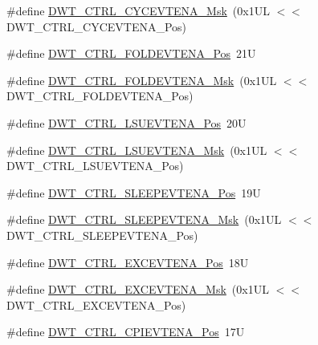 \begin{DoxyCompactItemize}
\item 
\#define \mbox{\hyperlink{group___c_m_s_i_s___d_w_t_ga40554bd81460e39abf08810f45fac1a2}{D\+W\+T\+\_\+\+C\+T\+R\+L\+\_\+\+C\+Y\+C\+E\+V\+T\+E\+N\+A\+\_\+\+Msk}}~(0x1\+U\+L $<$$<$ D\+W\+T\+\_\+\+C\+T\+R\+L\+\_\+\+C\+Y\+C\+E\+V\+T\+E\+N\+A\+\_\+\+Pos)
\item 
\#define \mbox{\hyperlink{group___c_m_s_i_s___d_w_t_ga5602b0707f446ce78d88ff2a3a82bfff}{D\+W\+T\+\_\+\+C\+T\+R\+L\+\_\+\+F\+O\+L\+D\+E\+V\+T\+E\+N\+A\+\_\+\+Pos}}~21U
\item 
\#define \mbox{\hyperlink{group___c_m_s_i_s___d_w_t_ga717e679d775562ae09185a3776b1582f}{D\+W\+T\+\_\+\+C\+T\+R\+L\+\_\+\+F\+O\+L\+D\+E\+V\+T\+E\+N\+A\+\_\+\+Msk}}~(0x1\+U\+L $<$$<$ D\+W\+T\+\_\+\+C\+T\+R\+L\+\_\+\+F\+O\+L\+D\+E\+V\+T\+E\+N\+A\+\_\+\+Pos)
\item 
\#define \mbox{\hyperlink{group___c_m_s_i_s___d_w_t_gaea5d1ee72188dc1d57b54c60a9f5233e}{D\+W\+T\+\_\+\+C\+T\+R\+L\+\_\+\+L\+S\+U\+E\+V\+T\+E\+N\+A\+\_\+\+Pos}}~20U
\item 
\#define \mbox{\hyperlink{group___c_m_s_i_s___d_w_t_gac47427f455fbc29d4b6f8a479169f2b2}{D\+W\+T\+\_\+\+C\+T\+R\+L\+\_\+\+L\+S\+U\+E\+V\+T\+E\+N\+A\+\_\+\+Msk}}~(0x1\+U\+L $<$$<$ D\+W\+T\+\_\+\+C\+T\+R\+L\+\_\+\+L\+S\+U\+E\+V\+T\+E\+N\+A\+\_\+\+Pos)
\item 
\#define \mbox{\hyperlink{group___c_m_s_i_s___d_w_t_ga9c6d62d121164013a8e3ee372f17f3e5}{D\+W\+T\+\_\+\+C\+T\+R\+L\+\_\+\+S\+L\+E\+E\+P\+E\+V\+T\+E\+N\+A\+\_\+\+Pos}}~19U
\item 
\#define \mbox{\hyperlink{group___c_m_s_i_s___d_w_t_ga2f431b3734fb840daf5b361034856da9}{D\+W\+T\+\_\+\+C\+T\+R\+L\+\_\+\+S\+L\+E\+E\+P\+E\+V\+T\+E\+N\+A\+\_\+\+Msk}}~(0x1\+U\+L $<$$<$ D\+W\+T\+\_\+\+C\+T\+R\+L\+\_\+\+S\+L\+E\+E\+P\+E\+V\+T\+E\+N\+A\+\_\+\+Pos)
\item 
\#define \mbox{\hyperlink{group___c_m_s_i_s___d_w_t_gaf4e73f548ae3e945ef8b1d9ff1281544}{D\+W\+T\+\_\+\+C\+T\+R\+L\+\_\+\+E\+X\+C\+E\+V\+T\+E\+N\+A\+\_\+\+Pos}}~18U
\item 
\#define \mbox{\hyperlink{group___c_m_s_i_s___d_w_t_gab7ee0def33423b5859ca4030dff63b58}{D\+W\+T\+\_\+\+C\+T\+R\+L\+\_\+\+E\+X\+C\+E\+V\+T\+E\+N\+A\+\_\+\+Msk}}~(0x1\+U\+L $<$$<$ D\+W\+T\+\_\+\+C\+T\+R\+L\+\_\+\+E\+X\+C\+E\+V\+T\+E\+N\+A\+\_\+\+Pos)
\item 
\#define \mbox{\hyperlink{group___c_m_s_i_s___d_w_t_ga9fff0b71fb0be1499f5180c6bce1fc8f}{D\+W\+T\+\_\+\+C\+T\+R\+L\+\_\+\+C\+P\+I\+E\+V\+T\+E\+N\+A\+\_\+\+Pos}}~17U
\item 
$$
\end{DoxyCompactItemize}
